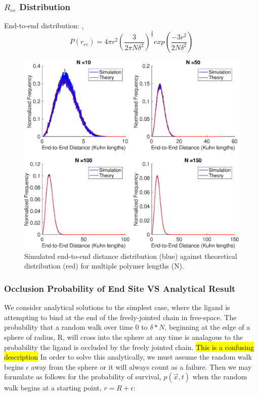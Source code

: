 \documentclass[../AdvancementSummary.tex]{subfiles}
\begin{document}
\subsubsection{$R_{ee}$ Distribution}

End-to-end distribution: \cite{VanValen2009}, \cite{Reeves2011}
\begin{equation*}
P(r_{ee}) = 4\pi r^2 \left( \frac{3}{2\pi N \delta^2}\right)^{\frac{3}{2}}exp\left(\frac{-3r^2}{2N \delta^2}\right)
\end{equation*}


\begin{figure}[H]
\begin{center}
\includegraphics[width=0.8\linewidth]{ModelConfirmationFigures/ReeDistribution.eps}
\caption{Simulated end-to-end distance distribution (blue) against theoretical distribution (red) for multiple polymer lengths (N). \label{fig: ReeDist}}
\end{center}
\end{figure}

\subsubsection{Occlusion Probability of End Site VS Analytical Result}

We consider analytical solutions to the simplest case, where the ligand is attempting to bind at the end of the freely-jointed chain in free-space. The probability that a random walk over time 0 to $\delta*N$, beginning at the edge of a sphere of radius, R, will cross into the sphere at any time is analagous to the probability the ligand is occluded by the freely jointed chain. \hl{This is a confusing description} In order to solve this analytically, we must assume the random walk begins $\epsilon$ away from the sphere or it will always count as a failure. Then we may formulate as follows for the probability of survival, $p(\vec{x},t)$ when the random walk begins at a starting point, $r=R+\epsilon$:
\end{document}
